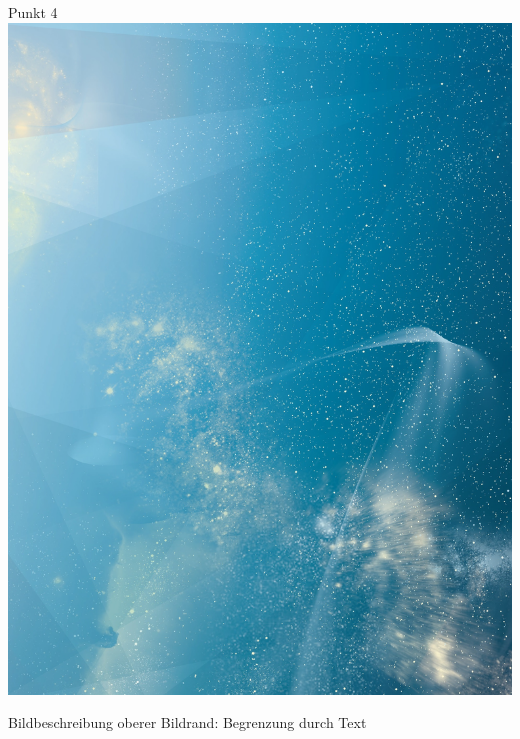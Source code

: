 \begin{frame}
\begin{frame}
\begin{multicols}{2}
    Punkt 4
    \vfill\columnbreak
    \includegraphics[width=\columnwidth, height=.7\textheight]{./Resources/Images/SternenhimmelHochkant.jpg}%
\end{multicols}
    
\end{frame}
\clearpage


\begin{frame}

Bildbeschreibung\newline
oberer Bildrand: Begrenzung durch Text\\[\baselineskip]


\end{frame}
\end{frame}
